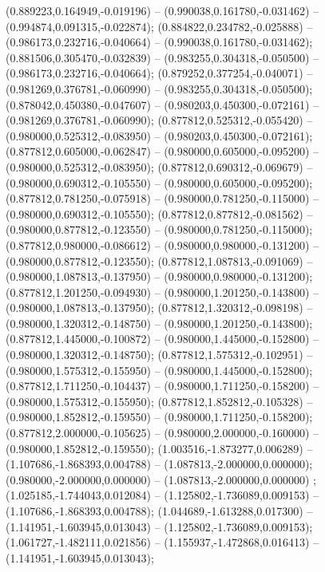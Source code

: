  (0.889223,0.164949,-0.019196) -- (0.990038,0.161780,-0.031462) -- (0.994874,0.091315,-0.022874);
 (0.884822,0.234782,-0.025888) -- (0.986173,0.232716,-0.040664) -- (0.990038,0.161780,-0.031462);
 (0.881506,0.305470,-0.032839) -- (0.983255,0.304318,-0.050500) -- (0.986173,0.232716,-0.040664);
 (0.879252,0.377254,-0.040071) -- (0.981269,0.376781,-0.060990) -- (0.983255,0.304318,-0.050500);
 (0.878042,0.450380,-0.047607) -- (0.980203,0.450300,-0.072161) -- (0.981269,0.376781,-0.060990);
 (0.877812,0.525312,-0.055420) -- (0.980000,0.525312,-0.083950) -- (0.980203,0.450300,-0.072161);
 (0.877812,0.605000,-0.062847) -- (0.980000,0.605000,-0.095200) -- (0.980000,0.525312,-0.083950);
 (0.877812,0.690312,-0.069679) -- (0.980000,0.690312,-0.105550) -- (0.980000,0.605000,-0.095200);
 (0.877812,0.781250,-0.075918) -- (0.980000,0.781250,-0.115000) -- (0.980000,0.690312,-0.105550);
 (0.877812,0.877812,-0.081562) -- (0.980000,0.877812,-0.123550) -- (0.980000,0.781250,-0.115000);
 (0.877812,0.980000,-0.086612) -- (0.980000,0.980000,-0.131200) -- (0.980000,0.877812,-0.123550);
 (0.877812,1.087813,-0.091069) -- (0.980000,1.087813,-0.137950) -- (0.980000,0.980000,-0.131200);
 (0.877812,1.201250,-0.094930) -- (0.980000,1.201250,-0.143800) -- (0.980000,1.087813,-0.137950);
 (0.877812,1.320312,-0.098198) -- (0.980000,1.320312,-0.148750) -- (0.980000,1.201250,-0.143800);
 (0.877812,1.445000,-0.100872) -- (0.980000,1.445000,-0.152800) -- (0.980000,1.320312,-0.148750);
 (0.877812,1.575312,-0.102951) -- (0.980000,1.575312,-0.155950) -- (0.980000,1.445000,-0.152800);
 (0.877812,1.711250,-0.104437) -- (0.980000,1.711250,-0.158200) -- (0.980000,1.575312,-0.155950);
 (0.877812,1.852812,-0.105328) -- (0.980000,1.852812,-0.159550) -- (0.980000,1.711250,-0.158200);
 (0.877812,2.000000,-0.105625) -- (0.980000,2.000000,-0.160000) -- (0.980000,1.852812,-0.159550);
 (1.003516,-1.873277,0.006289) -- (1.107686,-1.868393,0.004788) -- (1.087813,-2.000000,0.000000);
 (0.980000,-2.000000,0.000000) -- (1.087813,-2.000000,0.000000) ;
 (1.025185,-1.744043,0.012084) -- (1.125802,-1.736089,0.009153) -- (1.107686,-1.868393,0.004788);
 (1.044689,-1.613288,0.017300) -- (1.141951,-1.603945,0.013043) -- (1.125802,-1.736089,0.009153);
 (1.061727,-1.482111,0.021856) -- (1.155937,-1.472868,0.016413) -- (1.141951,-1.603945,0.013043);
